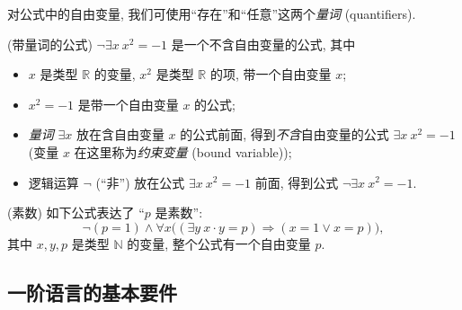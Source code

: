 对公式中的自由变量, 我们可使用``存在''和``任意''这两个\emph{量词} (quantifiers).

\begin{example}
	{(带量词的公式)}
	$\neg\exists x\ x^2=-1$ 是一个不含自由变量的公式, 其中
	\begin{itemize}
		\item $x$ 是类型 $\mathbb{R}$ 的变量, $x^2$ 是类型 $\mathbb{R}$ 的项, 带一个自由变量 $x$;
		\item $x^2=-1$ 是带一个自由变量 $x$ 的公式;
		\item \emph{量词} $\exists x$ 放在含自由变量 $x$ 的公式前面, 得到\emph{不含}自由变量的公式 $\exists x\ x^2=-1$ (变量 $x$ 在这里称为\emph{约束变量} (bound variable));
		\item 逻辑运算 $\neg$ (``非'') 放在公式 $\exists x\ x^2=-1$ 前面, 得到公式 $\neg\exists x\ x^2=-1$. %
	\end{itemize}
\end{example}

\begin{example}
	{(素数)}
	如下公式表达了 ``$p$ 是素数'':
	$$
	\neg(p=1) \wedge \forall x \big((\exists y\ x\cdot y = p) \Rightarrow (x=1 \vee x=p)\big),
	$$
	其中 $x,y,p$ 是类型 $\mathbb{N}$ 的变量,
	整个公式有一个自由变量 $p$.
\end{example}





\subsection{一阶语言的基本要件}

